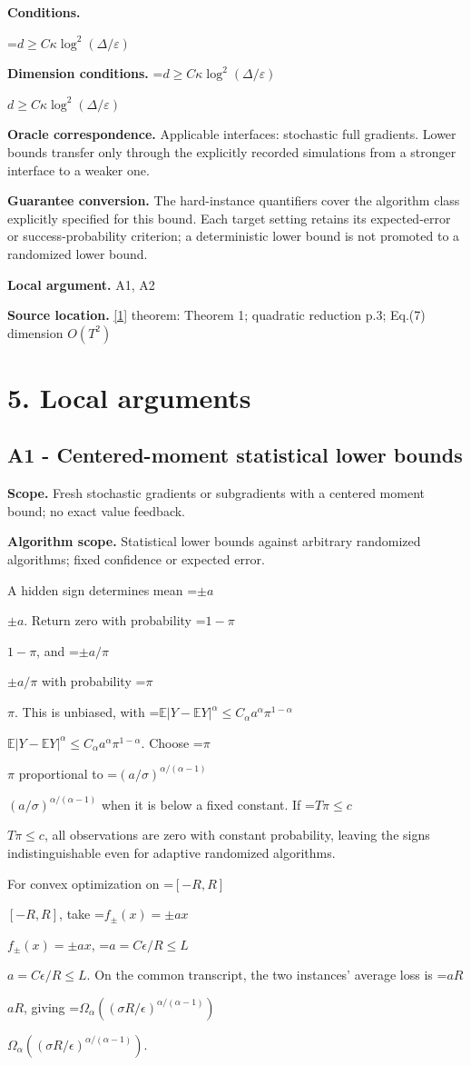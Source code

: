 \documentclass[10pt,a4paper]{article}
\newcommand{\AtlasMath}[1]{\par\begingroup\centering\setbox0=\hbox{$\displaystyle #1$}\ifdim\wd0>1.4\linewidth\typeout{ATLAS WIDE FORMULA: \the\wd0}\fi\ifdim\wd0>\linewidth\resizebox{\linewidth}{!}{\box0}\else\box0\fi\par\endgroup}
\newcommand{\AtlasInlineMath}[1]{\begingroup\setbox0=\hbox{$#1$}\ifdim\wd0>.4\linewidth\endgroup\AtlasMath{#1}\else\endgroup$#1$\fi}
\begin{document}
\textbf{Conditions.} 
\AtlasMath{d\ge C\kappa\log^2(\Delta/\varepsilon)}


\textbf{Dimension conditions.} \AtlasInlineMath{d\ge C\kappa\log^2(\Delta/\varepsilon)}

\textbf{Oracle correspondence.} Applicable interfaces: stochastic full gradients. Lower bounds transfer only through the explicitly recorded simulations from a stronger interface to a weaker one.

\textbf{Guarantee conversion.} The hard-instance quantifiers cover the algorithm class explicitly specified for this bound. Each target setting retains its expected-error or success-probability criterion; a deterministic lower bound is not promoted to a randomized lower bound.

\textbf{Local argument.} A1, A2

\textbf{Source location.} \href{https://arxiv.org/pdf/2609.10874}{[1]} theorem: Theorem 1; quadratic reduction p.3; Eq.(7) dimension $O(T^2)$

\section{5. Local arguments}
\subsection{A1 - Centered-moment statistical lower bounds}
\textbf{Scope.} Fresh stochastic gradients or subgradients with a centered moment bound; no exact value feedback.

\textbf{Algorithm scope.} Statistical lower bounds against arbitrary randomized algorithms; fixed confidence or expected error.

A hidden sign determines mean \AtlasInlineMath{\pm a}. Return zero with probability \AtlasInlineMath{1-\pi}, and \AtlasInlineMath{\pm a/\pi} with probability \AtlasInlineMath{\pi}. This is unbiased, with
\AtlasInlineMath{\mathbb E|Y-\mathbb EY|^\alpha\le C_\alpha a^\alpha\pi^{1-\alpha}}.
Choose \AtlasInlineMath{\pi} proportional to \AtlasInlineMath{(a/\sigma)^{\alpha/(\alpha-1)}} when it is below a fixed constant. If \AtlasInlineMath{T\pi\le c}, all observations are zero with constant probability, leaving the signs indistinguishable even for adaptive randomized algorithms.

For convex optimization on \AtlasInlineMath{[-R,R]}, take \AtlasInlineMath{f_\pm(x)=\pm ax}, \AtlasInlineMath{a=C\epsilon/R\le L}. On the common transcript, the two instances' average loss is \AtlasInlineMath{aR}, giving
\AtlasInlineMath{\Omega_\alpha((\sigma R/\epsilon)^{\alpha/(\alpha-1)})}.
\end{document}
